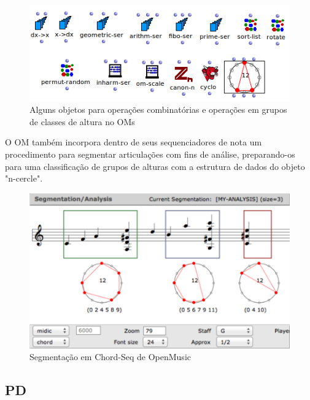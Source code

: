 \documentclass[
	12pt,				%
	openright,			%
	twoside,			%
	a4paper,			%
	english,			%
	french,				%
	spanish,			%
	brazil				%
	]{abntex2}
\begin{document}
\begin{figure}[!h]
	\caption{\label{fig_grafico}Alguns objetos para operações combinatórias e operações em grupos de classes de altura no OMs}
	\begin{center}
	    \includegraphics[scale=0.7]{OMPD/series-OM.png}
	\end{center}
\end{figure}

O OM também incorpora dentro de seus sequenciadores de nota um procedimento para segmentar articulações com fins de análise, preparando-os para uma classificação de grupos de alturas com a estrutura de dados do objeto "n-cercle"\cite{bresson2012new}.

\begin{figure}[!h]
	\caption{\label{fig_grafico}Segmentação em Chord-Seq de OpenMusic}
	\begin{center}
	    \includegraphics[scale=0.4]{OMPD/segmentaOM.png}
	\end{center}
\end{figure}


\pagebreak
\subsection{PD}
\end{document}
